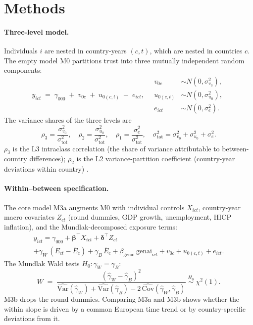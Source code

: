 \section{Methods}\label{sec:methods}

\paragraph{Three-level model.}
Individuals $i$ are nested in country-years $(c,t)$, which are nested
in countries $c$. The empty model M0 partitions trust into three
mutually independent random components:
\begin{equation}
y_{ict} \;=\; \gamma_{000} \;+\; v_{0c} \;+\; u_{0(c,t)} \;+\; e_{ict},
\quad
\begin{aligned}
v_{0c} &\sim N(0,\sigma^{2}_{v_0}), \\
u_{0(c,t)} &\sim N(0,\sigma^{2}_{u_0}), \\
e_{ict} &\sim N(0,\sigma^{2}_e).
\end{aligned}
\label{eq:m0}
\end{equation}
The variance shares of the three levels are
\[
\rho_{3} = \frac{\sigma^{2}_{v_0}}{\sigma^{2}_{\mathrm{tot}}},
\quad
\rho_{2} = \frac{\sigma^{2}_{u_0}}{\sigma^{2}_{\mathrm{tot}}},
\quad
\rho_{1} = \frac{\sigma^{2}_e}{\sigma^{2}_{\mathrm{tot}}},
\quad
\sigma^{2}_{\mathrm{tot}} = \sigma^{2}_{v_0} + \sigma^{2}_{u_0} + \sigma^{2}_e.
\]
$\rho_3$ is the L3 intraclass correlation (the share of variance
attributable to between-country differences); $\rho_2$ is the L2
variance-partition coefficient (country-year deviations within country)
\citep{SnijdersBosker2011}.

\paragraph{Within--between specification.}
The core model M3a augments M0 with individual controls $X_{ict}$,
country-year macro covariates $Z_{ct}$ (round dummies, GDP growth,
unemployment, HICP inflation), and the Mundlak-decomposed exposure
terms:
\begin{multline}
y_{ict} = \gamma_{000}
+ \boldsymbol{\beta}^{\!\top} X_{ict}
+ \boldsymbol{\delta}^{\!\top} Z_{ct} \\
+ \gamma_{W}\,(E_{ct}-\bar E_c)
+ \gamma_{B}\,\bar E_c
+ \beta_{\mathrm{genai}}\,\mathrm{genai}_{ict}
+ v_{0c} + u_{0(c,t)} + e_{ict}.
\label{eq:m3a}
\end{multline}
The Mundlak Wald tests $H_0:\gamma_W = \gamma_B$:
\begin{equation}
W \;=\; \frac{(\hat\gamma_W - \hat\gamma_B)^{2}}
              {\widehat{\mathrm{Var}}(\hat\gamma_W)
               + \widehat{\mathrm{Var}}(\hat\gamma_B)
               - 2\,\widehat{\mathrm{Cov}}(\hat\gamma_W,\hat\gamma_B)}
\;\overset{H_0}{\sim}\; \chi^{2}(1).
\label{eq:wald}
\end{equation}
M3b drops the round dummies. Comparing M3a and M3b shows whether the
within slope is driven by a common European time trend or by
country-specific deviations from it.

